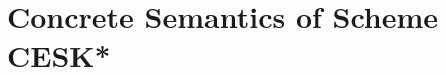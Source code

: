 \documentclass[12pt,draft]{article}
\begin{document}
\newcommand\mdoubleplus{\ensuremath{\mathbin{+\mkern-9mu+}}}
\newcommand\mae{\ensuremath{\text{\ae}}}
\newcommand{\lamsyn}[2]{(\lambda\;(#1 ...)\;#2)}
\newcommand{\singlelamsyn}[2]{(\lambda\;(#1)\;#2)}
\newcommand{\letsyn}[3]{(\texttt{let}\;(#1\;#2)\;#3)}
\newcommand{\ifsyn}[3]{(\texttt{if}\;#1\;#2\;#3)}
\newcommand{\primsyn}[3]{(\texttt{prim}\;#1\;#2\;#3 ...)}
\newcommand{\callccsyn}[1]{(\texttt{call/cc\;#1})}
\newcommand{\truesyn}{\texttt{\#t}}
\newcommand{\falsesyn}{\texttt{\#f}}


\section{Concrete Semantics of Scheme CESK*}
\end{document}

